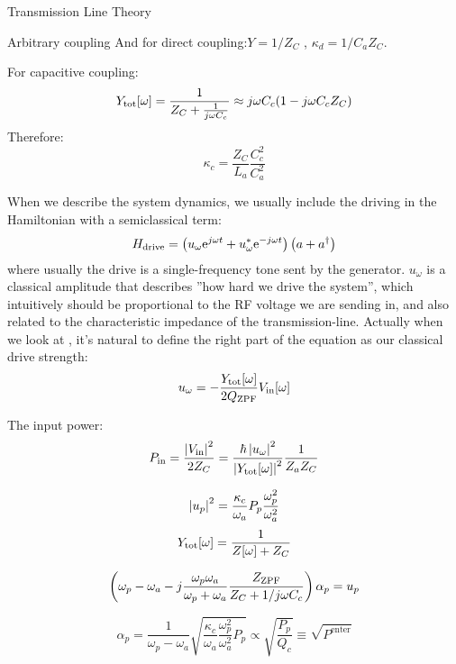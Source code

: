 \begin{section}{Transmission Line Theory}
\begin{subsection}{Arbitrary coupling}
And for direct coupling:$Y = 1/Z_C$ ,  $\kappa_d = 1/C_a Z_C$.

For capacitive coupling: 
\begin{equation}\label{eq:Y_c}
Y_{\mathrm{tot}}[\omega] = \frac{1}{Z_C + \frac{1}{j \omega C_c}} \approx j \omega C_c (1-j \omega C_c Z_C)
\end{equation}
Therefore: 
\begin{equation}\label{eq:kappa_c}
\kappa_c = \frac{Z_C}{L_a}\frac{C_c^2}{C_a^2}
\end{equation}









When we describe the system dynamics, we usually include the driving in the Hamiltonian with a semiclassical term: 
\begin{equation}\label{eq:Hdrive}
H_{\mathrm{drive}} = \left( u_\omega \mathrm{e}^{j\omega t} +  u_\omega^* \mathrm{e}^{-j\omega t} \right)\left(a + a^\dagger\right)
\end{equation}
where usually the drive is a single-frequency tone sent by the generator. $u_\omega$ is a classical amplitude that describes ''how hard we drive the system'', which intuitively should be proportional to the RF voltage we are sending in, and also related to the characteristic impedance of the transmission-line. Actually when we look at , it's natural to define the right part of the equation as our classical drive strength: 
\begin{equation}\label{eq:u}
u_\omega = - \frac{Y_{\mathrm{tot}}[\omega]}{2Q_{\mathrm{ZPF}}} V_{\mathrm{in}}[\omega]
\end{equation}

The input power: 
\begin{equation}\label{eq:Pin}
P_{\mathrm{in}} = \frac{{\left | V_{\mathrm{in}} \right |}^2}{2{Z_C}} = \frac{\hbar \left | u_\omega \right |^2}{\left | Y_{\mathrm{tot}}[\omega] \right |^2}\frac{1}{Z_a Z_C}
\end{equation}


\begin{equation}\label{eq:P_p}
 \left | u_p \right |^2 =  \frac{\kappa_c}{\omega_a} P_p \frac{\omega_p^2}{\omega_a^2}
\end{equation}
\begin{equation}
Y_{\mathrm{tot}}[\omega] = \frac{1}{Z[\omega]+Z_C}
\end{equation}

\begin{equation}
\left( \omega_p - \omega_a - j \frac{\omega_p \omega_a}{\omega_p + \omega_a} \frac{Z_{\mathrm{ZPF}}}{Z_C + 1/j \omega C_c}\right) \alpha_p = u_p
\end{equation}


\begin{equation}
\alpha_p = \frac{1}{\omega_p-\omega_a} \sqrt{\frac{\kappa_c}{\omega_a}\frac{\omega_p^2}{\omega_a^2}P_p} \propto \sqrt{\frac{P_p}{Q_c}} \equiv \sqrt{P^\mathrm{enter}}
\end{equation}

\end{subsection}


\end{section}


